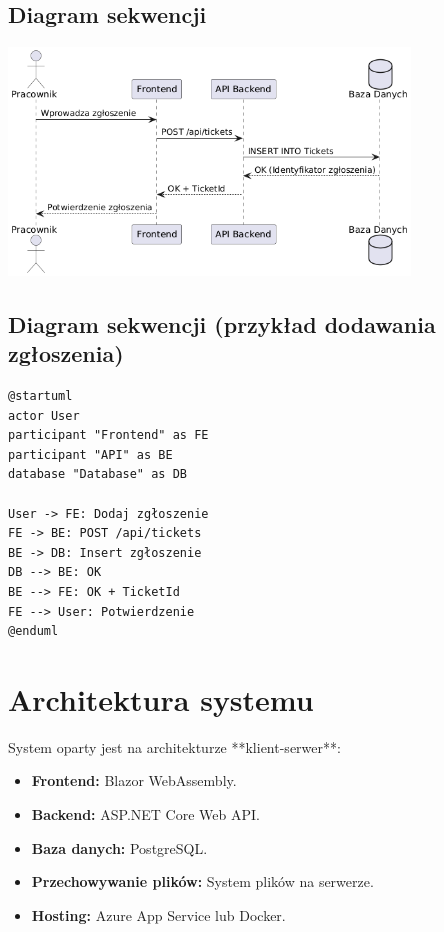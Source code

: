 \documentclass[a4paper,12pt]{article}
\begin{document}
\subsection{Diagram sekwencji}
\begin{center}
\includegraphics[width=0.8\textwidth]{draw/diagramSekwencji.png}
\end{center}

\newpage

\subsection{Diagram sekwencji (przykład dodawania zgłoszenia)}
\begin{lstlisting}[language=PlantUML, caption=Kod PlantUML dla diagramu sekwencji]
@startuml
actor User
participant "Frontend" as FE
participant "API" as BE
database "Database" as DB

User -> FE: Dodaj zgłoszenie
FE -> BE: POST /api/tickets
BE -> DB: Insert zgłoszenie
DB --> BE: OK
BE --> FE: OK + TicketId
FE --> User: Potwierdzenie
@enduml
\end{lstlisting}

\newpage

\section{Architektura systemu}
System oparty jest na architekturze **klient-serwer**:
\begin{itemize}
    \item \textbf{Frontend:} Blazor WebAssembly.
    \item \textbf{Backend:} ASP.NET Core Web API.
    \item \textbf{Baza danych:} PostgreSQL.
    \item \textbf{Przechowywanie plików:} System plików na serwerze.
    \item \textbf{Hosting:} Azure App Service lub Docker.
\end{itemize}
\end{document}
